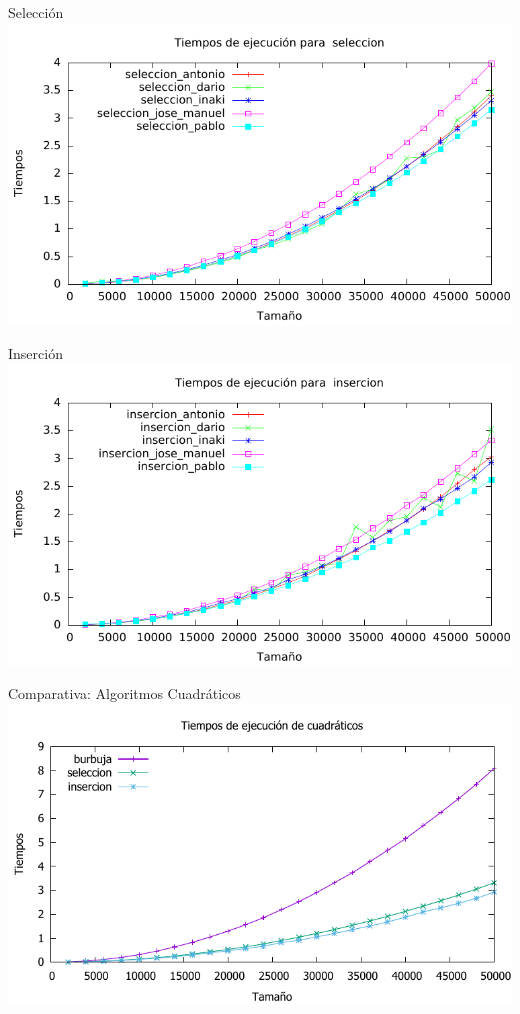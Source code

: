 \documentclass[10pt,compress,usetitleprogressbar,mathserif]{beamer}
\begin{document}
\begin{frame}{Selección}
	\includegraphics[width = \textwidth ]{seleccion_todos_g}
\end{frame}

\begin{frame}{Inserción}
	\includegraphics[width = \textwidth ]{insercion_todos_g}
\end{frame}

\begin{frame}{Comparativa: Algoritmos Cuadráticos}
	\includegraphics[width = \textwidth ]{comparativa_cuadraticos_g}
\end{frame}
\end{document}
